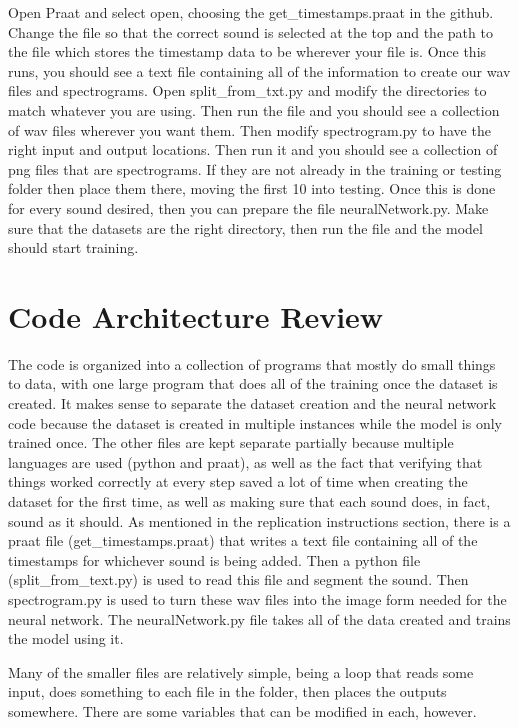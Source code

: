 \documentclass[10pt,twocolumn]{article}
\begin{document}
Open Praat and select open, choosing the get\_timestamps.praat in the github. Change the file so that the correct sound is selected at the top and the path to the file which stores the timestamp data to be wherever your file is. Once this runs, you should see a text file containing all of the information to create our wav files and spectrograms. Open split\_from\_txt.py and modify the directories to match whatever you are using. Then run the file and you should see a collection of wav files wherever you want them. Then modify spectrogram.py to have the right input and output locations. Then run it and you should see a collection of png files that are spectrograms. If they are not already in the training or testing folder then place them there, moving the first 10 into testing. Once this is done for every sound desired, then you can prepare the file neuralNetwork.py. Make sure that the datasets are the right directory, then run the file and the model should start training. 


\section{Code Architecture Review}

The code is organized into a collection of programs that mostly do small things to data, with one large program that does all of the training once the dataset is created. It makes sense to separate the dataset creation and the neural network code because the dataset is created in multiple instances while the model is only trained once. The other files are kept separate partially because multiple languages are used (python and praat), as well as the fact that verifying that things worked correctly at every step saved a lot of time when creating the dataset for the first time, as well as making sure that each sound does, in fact, sound as it should. As mentioned in the replication instructions section, there is a praat file (get\_timestamps.praat) that writes a text file containing all of the timestamps for whichever sound is being added. Then a python file (split\_from\_text.py) is used to read this file and segment the sound. Then spectrogram.py is used to turn these wav files into the image form needed for the neural network. The neuralNetwork.py file takes all of the data created and trains the model using it.

Many of the smaller files are relatively simple, being a loop that reads some input, does something to each file in the folder, then places the outputs somewhere. There are some variables that can be modified in each, however. 
\end{document}
